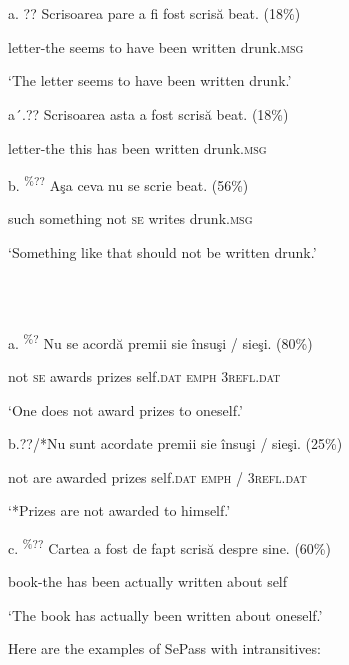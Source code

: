 \documentclass[output=paper]{langsci/langscibook}
\begin{document}
\ea%
    \label{ex:key:41}
    \gll\\
        \\
    \glt
    \z

          a.    ??  Scrisoarea pare   a   fi     fost   scrisă   beat.      (18\%)    

             letter-the  seems to have been written drunk.\textsc{msg} 

         ‘The letter seems to have been written drunk.’

a´.??  Scrisoarea asta a    fost   scrisă   beat.        (18\%)

          letter-the   this has been written drunk.\textsc{msg}

b. \textsuperscript{\%??}  Aşa  ceva           nu  se  scrie  beat.        (56\%)    

          such something not \textsc{se} writes drunk.\textsc{msg}

 ‘Something like that should not be written drunk.’

\ea%
    \label{ex:key:42}
    \gll\\
        \\
    \glt
    \z

          a.    \textsuperscript{\%?}  Nu se acordă premii sie          însuşi  / sieşi.      (80\%)      

           not \textsc{se} awards prizes self.\textsc{dat} \textsc{emph} 3\textsc{refl}.\textsc{dat}

            ‘One does not award prizes to oneself.’ 

b.??/*Nu sunt acordate premii sie         însuşi /  sieşi.      (25\%)      

           not are  awarded prizes  self.\textsc{dat} \textsc{emph /} 3\textsc{refl}.\textsc{dat}

 \textsc{‘*P}rizes are not awarded to himself.’

c.  \textsuperscript{\%??}  Cartea      a    fost de fapt    scrisă   despre sine.      (60\%)

              book-the has been actually written about self

             ‘The book has actually been written about oneself.’

Here are the examples of SePass with intransitives:

\ea%
    \label{ex:key:43}
    \gll\\
        \\
    \glt
    \z
\end{document}
